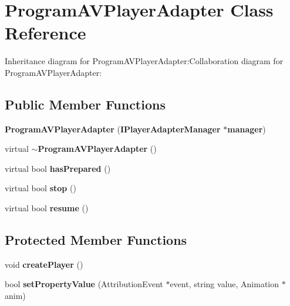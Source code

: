 \section{ProgramAVPlayerAdapter Class Reference}
\label{classbr_1_1pucrio_1_1telemidia_1_1ginga_1_1ncl_1_1adapters_1_1av_1_1tv_1_1ProgramAVPlayerAdapter}
Inheritance diagram for ProgramAVPlayerAdapter:Collaboration diagram for ProgramAVPlayerAdapter:\subsection*{Public Member Functions}
\begin{CompactItemize}
\item 
\textbf{ProgramAVPlayerAdapter} ({\bf IPlayerAdapterManager} $\ast${\bf manager})\label{classbr_1_1pucrio_1_1telemidia_1_1ginga_1_1ncl_1_1adapters_1_1av_1_1tv_1_1ProgramAVPlayerAdapter_a73014b27064e34ce52d0433c648c41f}

\item 
virtual {\bf $\sim$ProgramAVPlayerAdapter} ()\label{classbr_1_1pucrio_1_1telemidia_1_1ginga_1_1ncl_1_1adapters_1_1av_1_1tv_1_1ProgramAVPlayerAdapter_86567e2ec293eb05dda3434c0db0027e}

\item 
virtual bool \textbf{hasPrepared} ()\label{classbr_1_1pucrio_1_1telemidia_1_1ginga_1_1ncl_1_1adapters_1_1av_1_1tv_1_1ProgramAVPlayerAdapter_54fc8af2d22bee49a7858c6e0df829db}

\item 
virtual bool \textbf{stop} ()\label{classbr_1_1pucrio_1_1telemidia_1_1ginga_1_1ncl_1_1adapters_1_1av_1_1tv_1_1ProgramAVPlayerAdapter_3d0f1501fa4ccfb9e3f868ab4a185856}

\item 
virtual bool \textbf{resume} ()\label{classbr_1_1pucrio_1_1telemidia_1_1ginga_1_1ncl_1_1adapters_1_1av_1_1tv_1_1ProgramAVPlayerAdapter_0c7b890cc1963471052f4d51db565f8a}

\end{CompactItemize}
\subsection*{Protected Member Functions}
\begin{CompactItemize}
\item 
void \textbf{createPlayer} ()\label{classbr_1_1pucrio_1_1telemidia_1_1ginga_1_1ncl_1_1adapters_1_1av_1_1tv_1_1ProgramAVPlayerAdapter_2fbb9533e3d66799b0a433c9298ea70f}

\item 
bool \textbf{setPropertyValue} (AttributionEvent $\ast$event, string value, Animation $\ast$anim)\label{classbr_1_1pucrio_1_1telemidia_1_1ginga_1_1ncl_1_1adapters_1_1av_1_1tv_1_1ProgramAVPlayerAdapter_3e4b84e57de627326fc7bf7c4e129ba5}

\end{CompactItemize}
